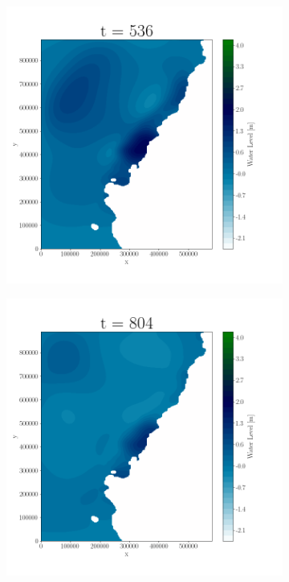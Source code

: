 \begin{figure}[H]
\begin{subfigure}[b]{.4\linewidth}
\includegraphics[width=\linewidth]{Figures/2-3.png}
\caption{}
\end{subfigure}
\begin{subfigure}[b]{.4\linewidth}
\includegraphics[width=\linewidth]{Figures/2-4.png}
\caption{}
\end{subfigure}


\end{figure}
